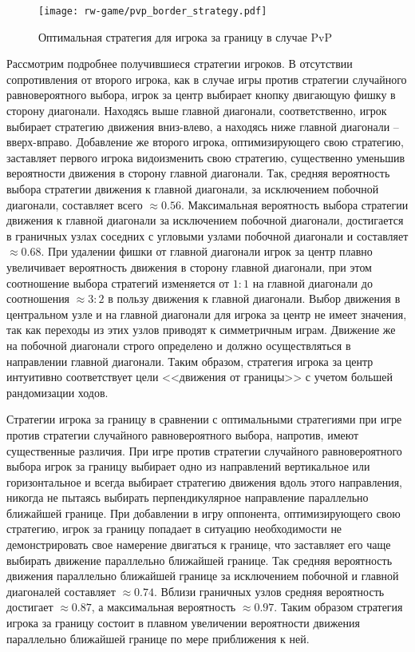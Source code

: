 \begin{figure}[t]
    \centering
    \texttt{[image: rw-game/pvp\_border\_strategy.pdf]}
    \caption{
        Оптимальная стратегия для игрока за границу в случае PvP
    }  
    \label{fig:optimal-strategy-pvp-border}
    
\end{figure}

Рассмотрим подробнее получившиеся стратегии игроков. В отсутствии сопротивления от второго игрока, как в случае игры против стратегии случайного равновероятного выбора, игрок за центр выбирает кнопку двигающую фишку в сторону диагонали. Находясь выше главной диагонали, соответственно, игрок выбирает стратегию движения вниз-влево, а находясь ниже главной диагонали -- вверх-вправо. Добавление же второго игрока, оптимизирующего свою стратегию, заставляет первого игрока видоизменить свою стратегию, существенно уменьшив вероятности движения в сторону главной диагонали. Так, средняя вероятность выбора стратегии движения к главной диагонали, за исключением побочной диагонали, составляет всего $\approx 0.56$. Максимальная вероятность выбора стратегии движения к главной диагонали за исключением побочной диагонали, достигается в граничных узлах соседних с угловыми узлами побочной диагонали и составляет $\approx 0.68$. При удалении фишки от главной диагонали игрок за центр плавно увеличивает вероятность движения в сторону главной диагонали, при этом соотношение выбора стратегий изменяется от $1:1$ на главной диагонали до соотношения $\approx 3:2$ в пользу движения к главной диагонали. Выбор движения в центральном узле и на главной диагонали для игрока за центр не имеет значения, так как переходы из этих узлов приводят к симметричным играм. Движение же на побочной диагонали строго определено и должно осуществляться в направлении главной диагонали. Таким образом, стратегия игрока за центр интуитивно соответствует цели <<движения от границы>> с учетом большей рандомизации ходов.

Стратегии игрока за границу в сравнении с оптимальными стратегиями при игре против стратегии случайного равновероятного выбора, напротив, имеют существенные различия. При игре против стратегии случайного равновероятного выбора игрок за границу выбирает одно из направлений вертикальное или горизонтальное и всегда выбирает стратегию движения вдоль этого направления, никогда не пытаясь выбирать перпендикулярное направление параллельно ближайшей границе. При добавлении в игру оппонента, оптимизирующего свою стратегию, игрок за границу попадает в ситуацию необходимости не демонстрировать свое намерение двигаться к границе, что заставляет его чаще выбирать движение параллельно ближайшей границе. Так средняя вероятность движения параллельно ближайшей границе за исключением побочной и главной диагоналей составляет $\approx 0.74$. Вблизи граничных узлов средняя вероятность достигает $\approx 0.87$, а максимальная вероятность $\approx 0.97$. Таким образом стратегия игрока за границу состоит в плавном увеличении вероятности движения параллельно ближайшей границе по мере приближения к ней. 



